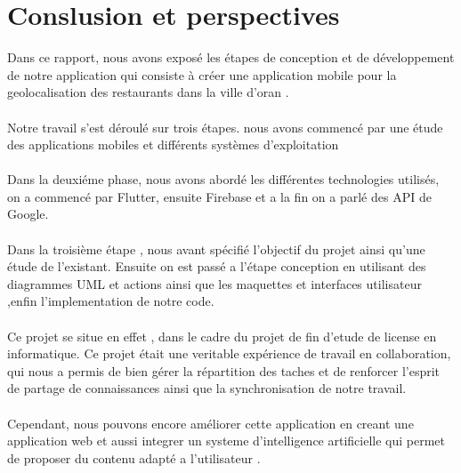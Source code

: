 \chapter{Conslusion et perspectives}
Dans ce rapport, nous avons exposé les étapes
de conception et de développement de notre 
application qui consiste à créer une application
mobile pour la geolocalisation des restaurants 
dans la ville d'oran .
\\
\\
Notre travail s'est déroulé sur trois étapes. nous avons commencé par une étude des applications mobiles et différents systèmes d'exploitation
\\
\\
Dans la deuxiéme phase, nous avons abordé les différentes technologies utilisés, on a commencé par Flutter, ensuite Firebase et a la fin on a parlé des API de Google.
\\
\\
Dans la troisième étape , nous avant spécifié l'objectif du projet ainsi qu'une étude de l'existant. Ensuite on est passé a l'étape conception 
en utilisant des diagrammes UML et actions ainsi que les maquettes et interfaces utilisateur ,enfin l'implementation de notre 
code.
\\
\\
Ce projet se situe en effet , dans le cadre du projet de
fin d'etude de license en informatique. Ce projet était une 
veritable expérience de travail en collaboration, qui nous a permis
de bien gérer la répartition des taches et de renforcer l'esprit 
de partage de connaissances ainsi que la synchronisation de 
notre travail.
\\
\\
Cependant, nous pouvons encore améliorer cette application 
en creant une application web  et aussi integrer un systeme 
d'intelligence artificielle qui permet de proposer du contenu 
adapté a l'utilisateur .
